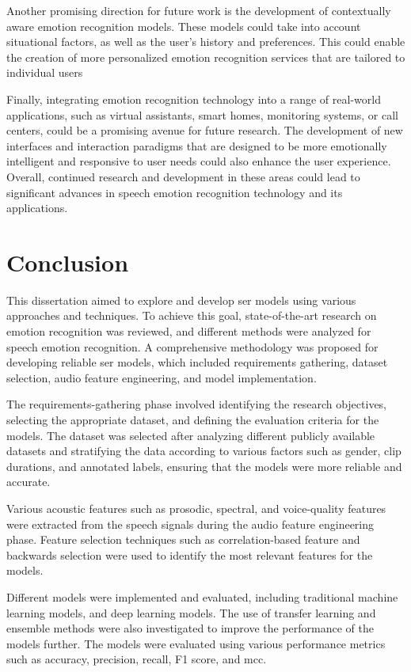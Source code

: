 Another promising direction for future work is the development of contextually aware emotion recognition models. These models could take into account situational factors, as well as the user's history and preferences. This could enable the creation of more personalized emotion recognition services that are tailored to individual users

Finally, integrating emotion recognition technology into a range of real-world applications, such as virtual assistants, smart homes, monitoring systems, or call centers, could be a promising avenue for future research. The development of new interfaces and interaction paradigms that are designed to be more emotionally intelligent and responsive to user needs could also enhance the user experience. Overall, continued research and development in these areas could lead to significant advances in speech emotion recognition technology and its applications.

\section{Conclusion}

This dissertation aimed to explore and develop \ac{ser} models using various approaches and techniques. To achieve this goal, state-of-the-art research on emotion recognition was reviewed, and different methods were analyzed for speech emotion recognition. A comprehensive methodology was proposed for developing reliable \ac{ser} models, which included requirements gathering, dataset selection, audio feature engineering, and model implementation.

The requirements-gathering phase involved identifying the research objectives, selecting the appropriate dataset, and defining the evaluation criteria for the models. The dataset was selected after analyzing different publicly available datasets and stratifying the data according to various factors such as gender, clip durations, and annotated labels, ensuring that the models were more reliable and accurate.

Various acoustic features such as prosodic, spectral, and voice-quality features were extracted from the speech signals during the audio feature engineering phase. Feature selection techniques such as correlation-based feature and backwards selection were used to identify the most relevant features for the models.

Different models were implemented and evaluated, including traditional machine learning models, and deep learning models. The use of transfer learning and ensemble methods were also investigated to improve the performance of the models further. The models were evaluated using various performance metrics such as accuracy, precision, recall, F1 score, and \ac{mcc}.

